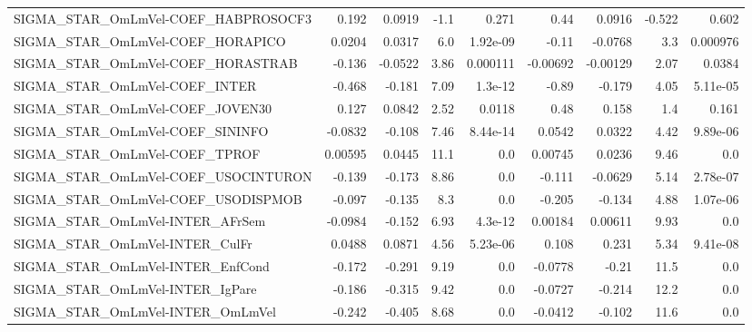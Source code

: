 \begin{tabular}{lrrrrrrrr}
SIGMA\_STAR\_OmLmVel-COEF\_HABPROSOCF3   &       0.192 &       0.0919 &    -1.1 &    0.271 &       0.44 &      0.0916 &       -0.522 &         0.602 \\
SIGMA\_STAR\_OmLmVel-COEF\_HORAPICO      &      0.0204 &       0.0317 &     6.0 & 1.92e-09 &      -0.11 &     -0.0768 &          3.3 &      0.000976 \\
SIGMA\_STAR\_OmLmVel-COEF\_HORASTRAB     &      -0.136 &      -0.0522 &    3.86 & 0.000111 &   -0.00692 &    -0.00129 &         2.07 &        0.0384 \\
SIGMA\_STAR\_OmLmVel-COEF\_INTER         &      -0.468 &       -0.181 &    7.09 &  1.3e-12 &      -0.89 &      -0.179 &         4.05 &      5.11e-05 \\
SIGMA\_STAR\_OmLmVel-COEF\_JOVEN30       &       0.127 &       0.0842 &    2.52 &   0.0118 &       0.48 &       0.158 &          1.4 &         0.161 \\
SIGMA\_STAR\_OmLmVel-COEF\_SININFO       &     -0.0832 &       -0.108 &    7.46 & 8.44e-14 &     0.0542 &      0.0322 &         4.42 &      9.89e-06 \\
SIGMA\_STAR\_OmLmVel-COEF\_TPROF         &     0.00595 &       0.0445 &    11.1 &      0.0 &    0.00745 &      0.0236 &         9.46 &           0.0 \\
SIGMA\_STAR\_OmLmVel-COEF\_USOCINTURON   &      -0.139 &       -0.173 &    8.86 &      0.0 &     -0.111 &     -0.0629 &         5.14 &      2.78e-07 \\
SIGMA\_STAR\_OmLmVel-COEF\_USODISPMOB    &      -0.097 &       -0.135 &     8.3 &      0.0 &     -0.205 &      -0.134 &         4.88 &      1.07e-06 \\
SIGMA\_STAR\_OmLmVel-INTER\_AFrSem       &     -0.0984 &       -0.152 &    6.93 &  4.3e-12 &    0.00184 &     0.00611 &         9.93 &           0.0 \\
SIGMA\_STAR\_OmLmVel-INTER\_CulFr        &      0.0488 &       0.0871 &    4.56 & 5.23e-06 &      0.108 &       0.231 &         5.34 &      9.41e-08 \\
SIGMA\_STAR\_OmLmVel-INTER\_EnfCond      &      -0.172 &       -0.291 &    9.19 &      0.0 &    -0.0778 &       -0.21 &         11.5 &           0.0 \\
SIGMA\_STAR\_OmLmVel-INTER\_IgPare       &      -0.186 &       -0.315 &    9.42 &      0.0 &    -0.0727 &      -0.214 &         12.2 &           0.0 \\
SIGMA\_STAR\_OmLmVel-INTER\_OmLmVel      &      -0.242 &       -0.405 &    8.68 &      0.0 &    -0.0412 &      -0.102 &         11.6 &           0.0 \\

\end{tabular}
